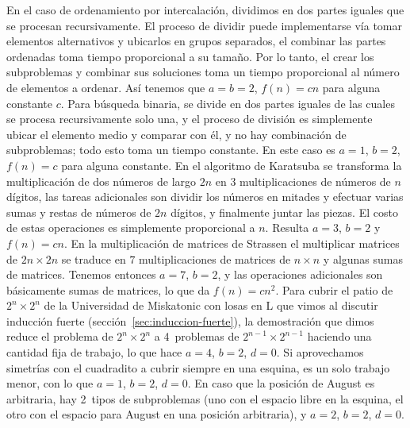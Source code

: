   En el caso de ordenamiento por intercalación,%
  dividimos en dos partes iguales
  que se procesan recursivamente.
  El proceso de dividir
  puede implementarse vía tomar elementos alternativos
  y ubicarlos en grupos separados,
  el combinar las partes ordenadas
  toma tiempo proporcional a su tamaño.
  Por lo tanto,
  el crear los subproblemas y combinar sus soluciones
  toma un tiempo proporcional al número de elementos a ordenar.
  Así tenemos que
  \(a = b = 2\), \(f(n) = c n\) para alguna constante \(c\).
  Para búsqueda binaria,%
  se divide en dos partes iguales
  de las cuales se procesa recursivamente solo una,
  y el proceso de división es simplemente ubicar el elemento medio
  y comparar con él,
  y no hay combinación de subproblemas;
  todo esto toma un tiempo constante.
  En este caso es
  \(a = 1\), \(b = 2\), \(f(n) = c\) para alguna constante.
  En el algoritmo de Karatsuba%
  se transforma la multiplicación de dos números de largo \(2 n\)
  en \(3\) multiplicaciones de números de \(n\) dígitos,
  las tareas adicionales son dividir los números en mitades
  y efectuar varias sumas y restas de números de \(2 n\) dígitos,
  y finalmente juntar las piezas.
  El costo de estas operaciones es simplemente proporcional a \(n\).
  Resulta \(a = 3\), \(b = 2\) y \(f(n) = c n\).
  En la multiplicación de matrices de Strassen%
  el multiplicar matrices de \(2 n \times 2 n\)
  se traduce en \(7\) multiplicaciones de matrices de \(n \times n\)
  y algunas sumas de matrices.
  Tenemos entonces \(a = 7\),
  \(b = 2\),
  y las operaciones adicionales son básicamente sumas de matrices,
  lo que da \(f(n) = c n^2\).
  Para cubrir el patio de \(2^n \times 2^n\)
  de la Universidad de Miskatonic con losas en L%
  que vimos al discutir inducción fuerte
  (sección~\ref{sec:induccion-fuerte}),
  la demostración que dimos reduce el problema de \(2^n \times 2^n\)
  a 4~problemas de \(2^{n - 1} \times 2^{n - 1}\)
  haciendo una cantidad fija de trabajo,
  lo que hace \(a = 4\), \(b = 2\), \(d = 0\).
  Si aprovechamos simetrías
  con el cuadradito a cubrir siempre en una esquina,
  es un solo trabajo menor,
  con lo que \(a = 1\), \(b = 2\), \(d = 0\).
  En caso que la posición de August es arbitraria,
  hay 2~tipos de subproblemas
  (uno con el espacio libre en la esquina,
   el otro con el espacio para August en una posición arbitraria),
  y \(a = 2\), \(b = 2\), \(d = 0\).

